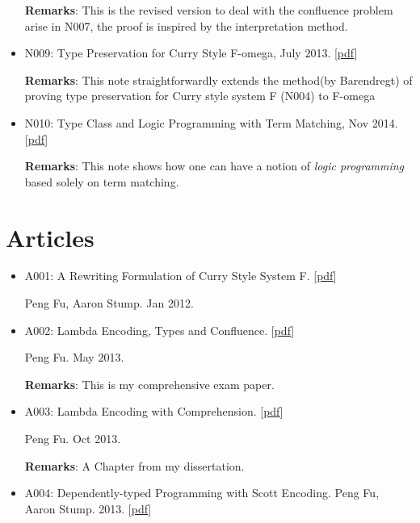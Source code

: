 \documentclass[10pt]{article}
\begin{document}
\begin{itemize}
\noindent \textbf{Remarks}: This is the revised version to deal with the confluence problem arise in N007, the proof is inspired by the interpretation method. 

\item N009: Type Preservation for Curry Style F-omega, July 2013. [\href{../../document/notes/fomega-presv.pdf}{pdf}]

\noindent \textbf{Remarks}: This note straightforwardly extends the method(by Barendregt) of proving type preservation for Curry style system F (N004) to F-omega

\item N010: Type Class and Logic Programming with Term Matching, Nov 2014. [\href{../../document/notes/tm.pdf}{pdf}]

\noindent \textbf{Remarks}: This note shows how one can have a notion of \textit{logic programming} based solely on term matching. 


  
\end{itemize}

\section*{Articles}

\begin{itemize}

\item A001: A Rewriting Formulation of Curry Style System F. [\href{../../document/notes/rewrite-f.pdf}{pdf}]

\noindent Peng Fu, Aaron Stump. Jan 2012.

\item A002: Lambda Encoding, Types and Confluence. [\href{../../document/notes/comp-exam.pdf}{pdf}]

\noindent Peng Fu. May 2013.

\noindent \textbf{Remarks}: This is my comprehensive exam paper. 

\item A003: Lambda Encoding with Comprehension. [\href{../../document/notes/comprehension.pdf}{pdf}]

\noindent Peng Fu. Oct 2013.

\noindent \textbf{Remarks}: A Chapter from my dissertation.


\item A004: Dependently-typed Programming with Scott Encoding. Peng Fu, Aaron Stump. 2013. [\href{../../document/papers/scott-dep.pdf}{pdf}]


\end{itemize}
\end{document}

